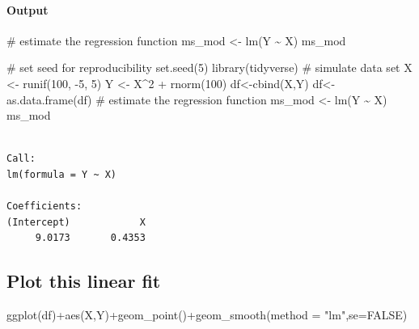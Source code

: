 \documentclass[
  letterpaper,
  DIV=11,
  numbers=noendperiod]{scrartcl}
\let\oldparagraph\paragraph
\renewcommand{\paragraph}[1]{\oldparagraph{#1}\mbox{}}
\newenvironment{Shaded}{\begin{snugshade}}{\end{snugshade}}
\newcommand{\AttributeTok}[1]{\textcolor[rgb]{0.40,0.45,0.13}{#1}}
\newcommand{\CommentTok}[1]{\textcolor[rgb]{0.37,0.37,0.37}{#1}}
\newcommand{\ConstantTok}[1]{\textcolor[rgb]{0.56,0.35,0.01}{#1}}
\newcommand{\DecValTok}[1]{\textcolor[rgb]{0.68,0.00,0.00}{#1}}
\newcommand{\FunctionTok}[1]{\textcolor[rgb]{0.28,0.35,0.67}{#1}}
\newcommand{\NormalTok}[1]{\textcolor[rgb]{0.00,0.23,0.31}{#1}}
\newcommand{\OtherTok}[1]{\textcolor[rgb]{0.00,0.23,0.31}{#1}}
\newcommand{\SpecialCharTok}[1]{\textcolor[rgb]{0.37,0.37,0.37}{#1}}
\newcommand{\StringTok}[1]{\textcolor[rgb]{0.13,0.47,0.30}{#1}}
\begin{document}
\hypertarget{output}{%
\paragraph{Output}\label{output}}

\begin{Shaded}
\begin{Highlighting}[]
\CommentTok{\# estimate the regression function}
\NormalTok{ms\_mod }\OtherTok{\textless{}{-}} \FunctionTok{lm}\NormalTok{(Y }\SpecialCharTok{\textasciitilde{}}\NormalTok{ X)}
\NormalTok{ms\_mod}
\end{Highlighting}
\end{Shaded}

\begin{Shaded}
\begin{Highlighting}[]
\CommentTok{\# set seed for reproducibility}
\FunctionTok{set.seed}\NormalTok{(}\DecValTok{5}\NormalTok{)}
\FunctionTok{library}\NormalTok{(tidyverse)}
\CommentTok{\# simulate data set}
\NormalTok{X }\OtherTok{\textless{}{-}} \FunctionTok{runif}\NormalTok{(}\DecValTok{100}\NormalTok{, }\SpecialCharTok{{-}}\DecValTok{5}\NormalTok{, }\DecValTok{5}\NormalTok{)}
\NormalTok{Y }\OtherTok{\textless{}{-}}\NormalTok{ X}\SpecialCharTok{\^{}}\DecValTok{2} \SpecialCharTok{+} \FunctionTok{rnorm}\NormalTok{(}\DecValTok{100}\NormalTok{)}
\NormalTok{df}\OtherTok{\textless{}{-}}\FunctionTok{cbind}\NormalTok{(X,Y)}
\NormalTok{df}\OtherTok{\textless{}{-}}\FunctionTok{as.data.frame}\NormalTok{(df)}
\CommentTok{\# estimate the regression function}
\NormalTok{ms\_mod }\OtherTok{\textless{}{-}} \FunctionTok{lm}\NormalTok{(Y }\SpecialCharTok{\textasciitilde{}}\NormalTok{ X)}
\NormalTok{ms\_mod}
\end{Highlighting}
\end{Shaded}

\begin{verbatim}

Call:
lm(formula = Y ~ X)

Coefficients:
(Intercept)            X  
     9.0173       0.4353  
\end{verbatim}

\hypertarget{plot-this-linear-fit}{%
\subsection{Plot this linear fit}\label{plot-this-linear-fit}}

\begin{Shaded}
\begin{Highlighting}[]
\FunctionTok{ggplot}\NormalTok{(df)}\SpecialCharTok{+}\FunctionTok{aes}\NormalTok{(X,Y)}\SpecialCharTok{+}\FunctionTok{geom\_point}\NormalTok{()}\SpecialCharTok{+}\FunctionTok{geom\_smooth}\NormalTok{(}\AttributeTok{method =} \StringTok{"lm"}\NormalTok{,}\AttributeTok{se=}\ConstantTok{FALSE}\NormalTok{)}
\end{Highlighting}
\end{Shaded}
\end{document}
